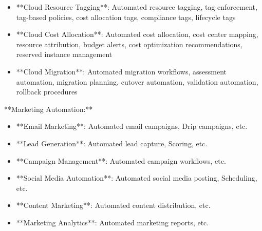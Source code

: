 \documentclass[11pt,a4paper]{article}
\begin{document}
\begin{itemize}
\item **Cloud Resource Tagging**: Automated resource tagging, tag enforcement, tag-based policies, cost allocation tags, compliance tags, lifecycle tags
\end{itemize}

\begin{itemize}
\item **Cloud Cost Allocation**: Automated cost allocation, cost center mapping, resource attribution, budget alerts, cost optimization recommendations, reserved instance management
\end{itemize}

\begin{itemize}
\item **Cloud Migration**: Automated migration workflows, assessment automation, migration planning, cutover automation, validation automation, rollback procedures
\end{itemize}

**Marketing Automation:**

\begin{itemize}
\item **Email Marketing**: Automated email campaigns, Drip campaigns, etc.
\end{itemize}

\begin{itemize}
\item **Lead Generation**: Automated lead capture, Scoring, etc.
\end{itemize}

\begin{itemize}
\item **Campaign Management**: Automated campaign workflows, etc.
\end{itemize}

\begin{itemize}
\item **Social Media Automation**: Automated social media posting, Scheduling, etc.
\end{itemize}

\begin{itemize}
\item **Content Marketing**: Automated content distribution, etc.
\end{itemize}

\begin{itemize}
\item **Marketing Analytics**: Automated marketing reports, etc.
\end{itemize}
\end{document}
